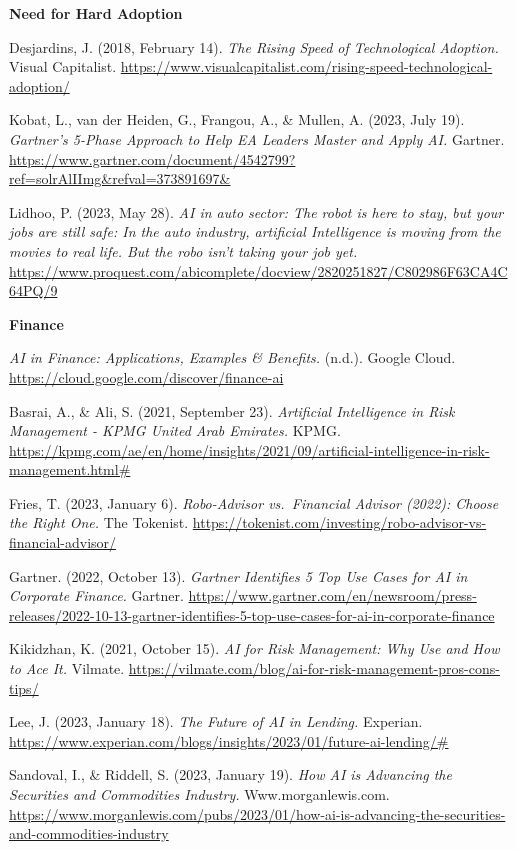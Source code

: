 \documentclass[
]{article}
\begin{document}
\textbf{Need for Hard Adoption}

Desjardins, J. (2018, February 14). \emph{The Rising Speed of Technological Adoption.} Visual Capitalist. \url{https://www.visualcapitalist.com/rising-speed-technological-adoption/}

Kobat, L., van der Heiden, G., Frangou, A., \& Mullen, A. (2023, July 19). \emph{Gartner's 5-Phase Approach to Help EA Leaders Master and Apply AI.} Gartner. \url{https://www.gartner.com/document/4542799?ref=solrAlIImg\&refval=373891697\&}

Lidhoo, P. (2023, May 28). \emph{AI in auto sector: The robot is here to stay, but your jobs are still safe: In the auto industry, artificial Intelligence is moving from the movies to real life. But the robo isn't taking your job yet.} \url{https://www.proquest.com/abicomplete/docview/2820251827/C802986F63CA4C64PQ/9}

\textbf{Finance}

\emph{AI in Finance: Applications, Examples \& Benefits.} (n.d.). Google Cloud. \url{https://cloud.google.com/discover/finance-ai}

Basrai, A., \& Ali, S. (2021, September 23). \emph{Artificial Intelligence in Risk Management - KPMG United Arab Emirates.} KPMG. \url{https://kpmg.com/ae/en/home/insights/2021/09/artificial-intelligence-in-risk-management.html\#}

Fries, T. (2023, January 6). \emph{Robo-Advisor vs.~Financial Advisor (2022): Choose the Right One.} The Tokenist. \url{https://tokenist.com/investing/robo-advisor-vs-financial-advisor/}

Gartner. (2022, October 13). \emph{Gartner Identifies 5 Top Use Cases for AI in Corporate Finance.} Gartner. \url{https://www.gartner.com/en/newsroom/press-releases/2022-10-13-gartner-identifies-5-top-use-cases-for-ai-in-corporate-finance}

Kikidzhan, K. (2021, October 15). \emph{AI for Risk Management: Why Use and How to Ace It.} Vilmate. \url{https://vilmate.com/blog/ai-for-risk-management-pros-cons-tips/}

Lee, J. (2023, January 18). \emph{The Future of AI in Lending.} Experian. \url{https://www.experian.com/blogs/insights/2023/01/future-ai-lending/\#}

Sandoval, I., \& Riddell, S. (2023, January 19). \emph{How AI is Advancing the Securities and Commodities Industry.} Www.morganlewis.com. \url{https://www.morganlewis.com/pubs/2023/01/how-ai-is-advancing-the-securities-and-commodities-industry}
\end{document}
